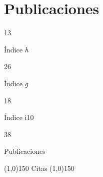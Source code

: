 \documentclass[11pt,a4paper,]{awesome-cv}
\begin{document}
\section{Publicaciones}\label{publicaciones}

\begin{tcolorbox}[enhanced,
        on line, 
        boxsep=4pt, left=0pt,right=0pt,top=0pt,bottom=0pt,
        colframe=white,colback=teal,
        hyperurl={https://scholar.google.com/citations?user=8Q0jKHsAAAAJ}]
  
\color{white}
  \begin{minipage}[c]{0.245\linewidth}
    \begin{center} 
      \begin{huge} 13 \end{huge}
     \begin{small} Índice \textit{h} \end{small} 
    \end{center} 
  \end{minipage} 
  \begin{minipage}[c]{0.245\linewidth}
    \begin{center} 
      \begin{huge} 26 \end{huge}
      \begin{small} Índice \textit{g} \end{small} 
    \end{center}
  \end{minipage} 
  \begin{minipage}[c]{0.245\linewidth}
    \begin{center} 
      \begin{huge} 18 \end{huge}
      \begin{small} Índice i10 \end{small} 
    \end{center}
  \end{minipage} 
  \begin{minipage}[c]{0.245\linewidth}
    \begin{center}  
      \begin{huge} 38 \end{huge}
      \begin{small} Publicaciones \end{small} 
    \end{center}
  \end{minipage} 
  
  \begin{center} \noindent\line(1,0){150} Citas \noindent\line(1,0){150} \end{center}
  

\end{tcolorbox}
\end{document}
